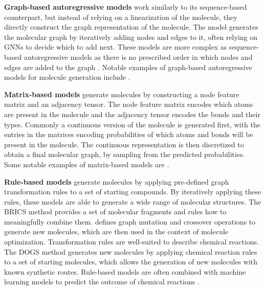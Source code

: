 \textbf{Graph-based autoregressive models} work similarly to its sequence-based counterpart, but
instead of relying on a linearization of the molecule, they directly construct the graph
representation of the molecule. The model generates the molecular graph by iteratively adding nodes
and edges to it, often relying on \acp{GNN} to decide which to add next. These models are more
complex as sequence-based autoregressive models as there is no prescribed order in which nodes and
edges are added to the graph \citep{hanFittingAutoregressiveGraph2023}. Notable examples of
graph-based autoregressive models for molecule generation include
\citep{liuConstrainedGraphVariational2018,liLearningDeepGenerative2018c,youGraphConvolutionalPolicy2018,cohen-karlikOvercomingOrderAutoregressive2024}.

\textbf{Matrix-based models}  generate molecules by constructing a node feature matrix and an
adjacency tensor. The node feature matrix encodes which atoms are present in the molecule and the
adjacency tensor encodes the bonds and their types. Commonly a continuous version of the molecule is
generated first, with the entries in the matrices encoding probabilities of which atoms and bonds
will be present in the molecule. The continuous representation is then discretized to obtain a final
molecular graph, by sampling from the predicted probabilities. Some notable examples of
matrix-based models are \citep{simonovskyGraphVAEGenerationSmall2018,caoMolGANImplicitGenerative2022,madhawaGraphNVPInvertibleFlow2019}.

\textbf{Rule-based models} generate molecules by applying pre-defined graph transformation rules to
a set of starting compounds. By iteratively applying these rules, these models are able to generate
a wide range of molecular structures. The BRICS \citep{degenArtCompilingUsing2008} method provides a
set of molecular fragments and rules how to meaningfully combine them.
\citet{jensenGraphbasedGeneticAlgorithm2019} defines graph mutation and crossover operations to
generate new molecules, which are then used in the context of molecule optimization. Transformation
rules are well-suited to describe chemical reactions. The DOGS method
\citep{hartenfellerDOGSReactionDrivenNovo2012} generates new molecules by applying chemical reaction
rules to a set of starting molecules, which allows the generation of new molecules with known
synthetic routes. Rule-based models are often combined with machine learning models to predict the
outcome of chemical reactions
\citep{seglerNeuralSymbolicMachineLearning2017,seglerPlanningChemicalSyntheses2018,fortunatoDataAugmentationPretraining2020,daiRetrosynthesisPredictionConditional2019}.


